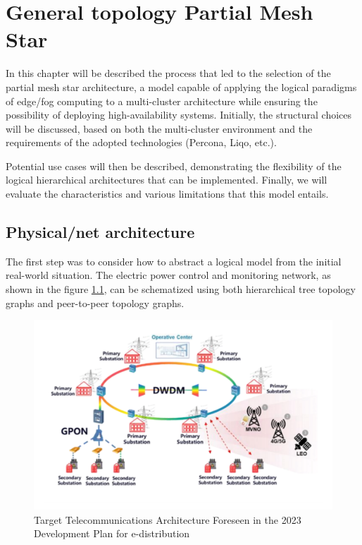 \chapter{General topology Partial Mesh Star}\label{chap:partial-mesh-star}
In this chapter will be described the process that led to the selection of the partial mesh star architecture, a model capable of applying the logical paradigms of edge/fog computing to a multi-cluster architecture while ensuring the possibility of deploying high-availability systems. Initially, the structural choices will be discussed, based on both the multi-cluster environment and the requirements of the adopted technologies (Percona, Liqo, etc.).

Potential use cases will then be described, demonstrating the flexibility of the logical hierarchical architectures that can be implemented. Finally, we will evaluate the characteristics and various limitations that this model entails.

\section{Physical/net architecture}
The first step was to consider how to abstract a logical model from the initial real-world situation. The electric power control and monitoring network, as shown in the figure \ref{fig:real-net}, can be schematized using both hierarchical tree topology graphs and peer-to-peer topology graphs.

\begin{figure}[ht]\centering
\includegraphics[scale=0.6]{Pictures/real-scheme-net}
\caption{Target Telecommunications Architecture Foreseen in the 2023 Development Plan for e-distribution}\label{fig:real-net}
\end{figure}


